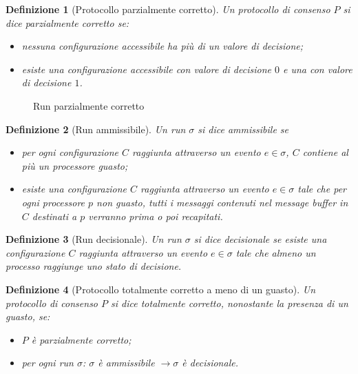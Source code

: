 \documentclass{article}
\newtheorem{definizione}{Definizione}
\begin{document}
\begin{definizione}[Protocollo parzialmente corretto]
  Un protocollo di consenso $P$ si dice \emph{parzialmente corretto}
  se:
\begin{itemize}
\item nessuna configurazione accessibile ha più di un valore di
  decisione;
\item esiste una configurazione accessibile con valore di decisione
  $0$ e una con valore di decisione $1$.
\end{itemize}  
\end{definizione}

\begin{figure}[!h]
  \centering \caption{Run
    parzialmente corretto}\label{fig:parzialmenteCorretto}
\end{figure}

\begin{definizione}[Run ammissibile]
  Un run $\sigma$ si dice \emph{ammissibile} se 
  \begin{itemize}
  \item per ogni configurazione $C$ raggiunta attraverso un evento
    $e\in \sigma$, $C$ contiene al più un processore guasto;
  \item esiste una configurazione $C$ raggiunta attraverso un evento
    $e\in \sigma$ tale che per ogni processore $p$ non guasto, tutti i
    messaggi contenuti nel message buffer in $C$ destinati a $p$
    verranno prima o poi recapitati.
  \end{itemize}
\end{definizione}

\begin{definizione}[Run decisionale]
  Un run $\sigma$ si dice \emph{decisionale} se esiste una
  configurazione $C$ raggiunta attraverso un evento $e\in \sigma$ tale
  che almeno un processo raggiunge uno stato di decisione.
\end{definizione}

\begin{definizione}[Protocollo totalmente corretto a meno di un guasto]
  Un protocollo di consenso $P$ si dice \emph{totalmente corretto},
  nonostante la presenza di un guasto, se:
\begin{itemize}
\item  $P$ è parzialmente corretto;
\item per ogni run $\sigma$: $\sigma$ \`e ammissibile $\rightarrow
  \sigma$ \`e decisionale.
\end{itemize}
\end{definizione}
\end{document}

